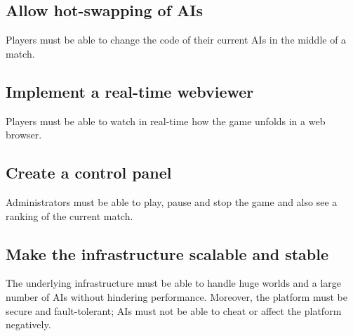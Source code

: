 \documentclass[a4paper,11pt,titlepage,abstract,numbers=noenddot,automark,mnsy,intlimits,rgb,dvipsnames]{report}
\begin{document}
\subsection{Allow hot-swapping of AIs}
Players must be able to change the code of their current AIs in the middle of a match.
\subsection{Implement a real-time webviewer}
Players must be able to watch in real-time how the game unfolds in a web browser.
\subsection{Create a control panel}
Administrators must be able to play, pause and stop the game and also see a ranking of the current match.
\subsection{Make the infrastructure scalable and stable}
The underlying infrastructure must be able to handle huge worlds and a large number of \texttt{}AI\texttt{}s without
hindering performance. Moreover, the platform must be secure and fault-tolerant; AIs must not be able to cheat
or affect the platform negatively.
\clearpage
\end{document}
